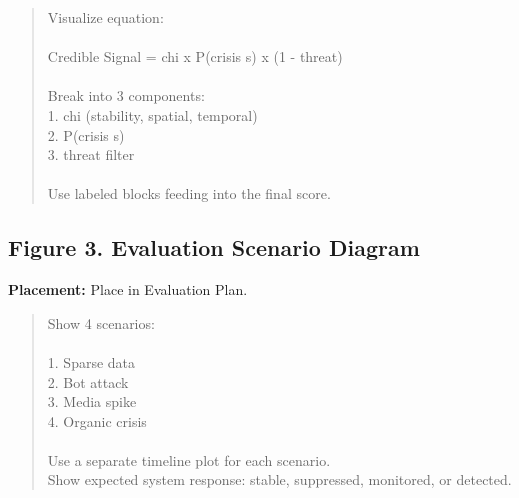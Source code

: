 \documentclass[11pt]{article}
\begin{document}
\begin{quote}
\ttfamily
Visualize equation:\\\\Credible Signal = chi x P(crisis \textbar{} s) x (1 - threat)\\\\Break into 3 components:\\1. chi (stability, spatial, temporal)\\2. P(crisis \textbar{} s)\\3. threat filter\\\\Use labeled blocks feeding into the final score.
\end{quote}

\subsection*{Figure 3. Evaluation Scenario Diagram}
\textbf{Placement:} Place in Evaluation Plan.

\begin{quote}
\ttfamily
Show 4 scenarios:\\\\1. Sparse data\\2. Bot attack\\3. Media spike\\4. Organic crisis\\\\Use a separate timeline plot for each scenario.\\Show expected system response: stable, suppressed, monitored, or detected.
\end{quote}
\end{document}
